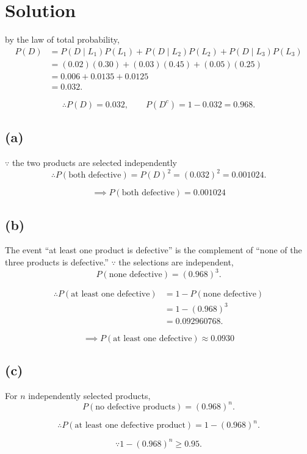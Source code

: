 \documentclass[12pt]{article}
\begin{document}
\section*{Solution}

by the law of total probability,
\begin{align*}
P(D)
&=P(D\mid L_1)P(L_1)
 +P(D\mid L_2)P(L_2)
 +P(D\mid L_3)P(L_3)\\
&=(0.02)(0.30)+(0.03)(0.45)+(0.05)(0.25)\\
&=0.006+0.0135+0.0125\\
&=0.032.
\end{align*}

\[
\therefore
P(D)=0.032,
\qquad
P(D^c)=1-0.032=0.968.
\]

\subsection*{(a)}

$\because $ the two products are selected independently
\[
\therefore
P(\text{both defective})
=
P(D)^2
=
(0.032)^2
=
0.001024.
\]

\[
\implies
P(\text{both defective})=0.001024
\]

\subsection*{(b)}
The event ``at least one product is defective'' is the complement of
``none of the three products is defective.''
$\because$ the selections are independent,
\[
P(\text{none defective})
=
(0.968)^3.
\]

\begin{align*}
\therefore
P(\text{at least one defective})
&=1-P(\text{none defective})\\
&=1-(0.968)^3\\
&=0.092960768.
\end{align*}

\[
\implies
P(\text{at least one defective})\approx 0.0930
\]

\subsection*{(c)}

For $n$ independently selected products,
\[
P(\text{no defective products})
=
(0.968)^n.
\]

\[
\therefore
P(\text{at least one defective product})
=
1-(0.968)^n.
\]

\[
\because
1-(0.968)^n\geq 0.95.
\]
\end{document}
